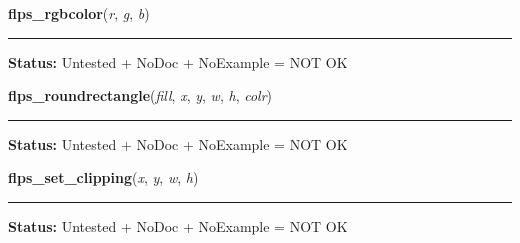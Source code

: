     \label{xformslib:library:flps_rgbcolor}

    \vspace{0.5ex}

\hspace{.8\funcindent}\begin{boxedminipage}{\funcwidth}

    \raggedright \textbf{flps\_rgbcolor}(\textit{r}, \textit{g}, \textit{b})

    \vspace{-1.5ex}

    \rule{\textwidth}{0.5\fboxrule}
\setlength{\parskip}{2ex}
\setlength{\parskip}{1ex}
\textbf{Status:} Untested + NoDoc + NoExample = NOT OK



    \end{boxedminipage}

    \label{xformslib:library:flps_roundrectangle}

    \vspace{0.5ex}

\hspace{.8\funcindent}\begin{boxedminipage}{\funcwidth}

    \raggedright \textbf{flps\_roundrectangle}(\textit{fill}, \textit{x}, \textit{y}, \textit{w}, \textit{h}, \textit{colr})

    \vspace{-1.5ex}

    \rule{\textwidth}{0.5\fboxrule}
\setlength{\parskip}{2ex}
\setlength{\parskip}{1ex}
\textbf{Status:} Untested + NoDoc + NoExample = NOT OK



    \end{boxedminipage}

    \label{xformslib:library:flps_set_clipping}

    \vspace{0.5ex}

\hspace{.8\funcindent}\begin{boxedminipage}{\funcwidth}

    \raggedright \textbf{flps\_set\_clipping}(\textit{x}, \textit{y}, \textit{w}, \textit{h})

    \vspace{-1.5ex}

    \rule{\textwidth}{0.5\fboxrule}
\setlength{\parskip}{2ex}
\setlength{\parskip}{1ex}
\textbf{Status:} Untested + NoDoc + NoExample = NOT OK



    \end{boxedminipage}

